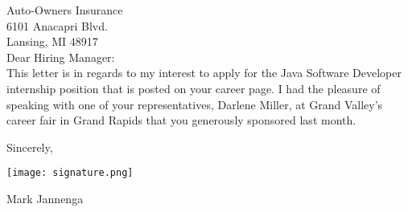 \documentclass{article}
\begin{document}
	\hfill										%

	\hfill

	Auto-Owners Insurance\\
	6101 Anacapri Blvd.\\
	Lansing, MI 48917\\

	Dear Hiring Manager:\\

	This letter is in regards to my interest to apply for the Java Software
	Developer internship position that is posted on your career page. I had the
	pleasure of speaking with one of your representatives, Darlene Miller, at
	Grand Valley's career fair in Grand Rapids that you generously sponsored
	last month.

	Sincerely,

	\texttt{[image: signature.png]}

	Mark Jannenga
\end{document}
